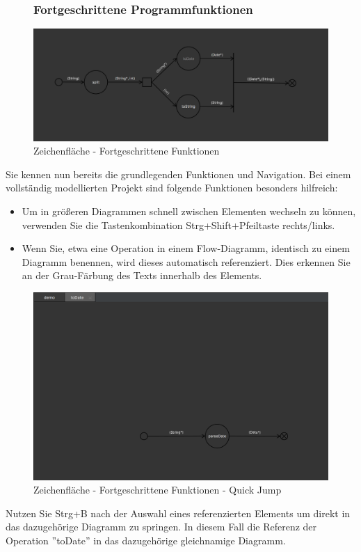 \begin{figure}[H]
\subsubsection{Fortgeschrittene Programmfunktionen}
	\centering
	\includegraphics[width=1\textwidth]{Advanced.png}
	\caption{Zeichenfläche - Fortgeschrittene Funktionen}	
\end{figure}
Sie kennen nun bereits die grundlegenden Funktionen und Navigation. Bei einem vollständig modellierten Projekt sind folgende Funktionen besonders hilfreich:
\begin{itemize}
	\item Um in größeren Diagrammen schnell zwischen Elementen wechseln zu können, verwenden Sie die Tastenkombination Strg+Shift+Pfeiltaste rechts/links. 
	\item Wenn Sie, etwa eine Operation in einem Flow-Diagramm,  identisch zu einem Diagramm benennen, wird dieses automatisch referenziert. Dies erkennen Sie an der Grau-Färbung des Texts innerhalb des Elements.
\end{itemize}



\begin{figure}[H]
	\centering
	\includegraphics[width=1\textwidth]{Advanced2.png}
	\caption{Zeichenfläche - Fortgeschrittene Funktionen - Quick Jump}
\end{figure}
Nutzen Sie Strg+B nach der Auswahl eines referenzierten Elements um direkt in das dazugehörige Diagramm zu springen. In diesem Fall die Referenz der Operation ''toDate'' in das dazugehörige gleichnamige Diagramm.


